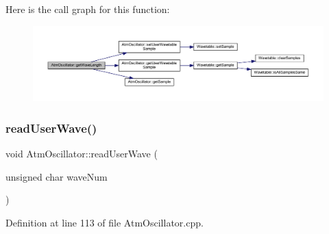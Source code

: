 Here is the call graph for this function\+:
\nopagebreak
\begin{figure}[H]
\begin{center}
\leavevmode
\includegraphics[width=350pt]{class_atm_oscillator_ad846116dfd6f232cae79ada35dddadfd_cgraph}
\end{center}
\end{figure}
\mbox{\label{class_atm_oscillator_a08b383cd2305c232de827399aa8d2ccb}} 
\subsubsection{\texorpdfstring{read\+User\+Wave()}{readUserWave()}}
{\footnotesize\ttfamily void Atm\+Oscillator\+::read\+User\+Wave (\begin{DoxyParamCaption}\item[{unsigned char}]{wave\+Num }\end{DoxyParamCaption})}



Definition at line 113 of file Atm\+Oscillator.\+cpp.


